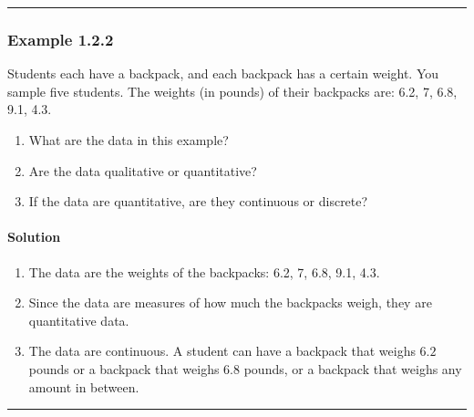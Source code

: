 \documentclass[letterpaper,10pt,english]{jupyterBook}
\begin{document}
\bigskip\hrule\bigskip



\subsubsection{Example 1.2.2}
\label{\detokenize{Ch1 Sampling and Data/1.2 Scales of Measurement:example-1-2-2}}
\sphinxAtStartPar
Students each have a backpack, and each backpack has a certain weight. You sample five students. The weights (in pounds) of their backpacks are: 6.2, 7, 6.8, 9.1, 4.3.
\begin{enumerate}
%
\item {} 
\sphinxAtStartPar
What are the data in this example?

\item {} 
\sphinxAtStartPar
Are the data qualitative or quantitative?

\item {} 
\sphinxAtStartPar
If the data are quantitative, are they continuous or discrete?

\end{enumerate}


\paragraph{Solution}
\label{\detokenize{Ch1 Sampling and Data/1.2 Scales of Measurement:id2}}\begin{enumerate}
%
\item {} 
\sphinxAtStartPar
The data are the weights of the backpacks: 6.2, 7, 6.8, 9.1, 4.3.

\item {} 
\sphinxAtStartPar
Since the data are measures of how much the backpacks weigh, they are quantitative data.

\item {} 
\sphinxAtStartPar
The data are continuous. A student can have a backpack that weighs \(6.2\) pounds or a backpack that weighs \(6.8\) pounds, or a backpack that weighs any amount in between.

\end{enumerate}


\bigskip\hrule\bigskip
\end{document}
